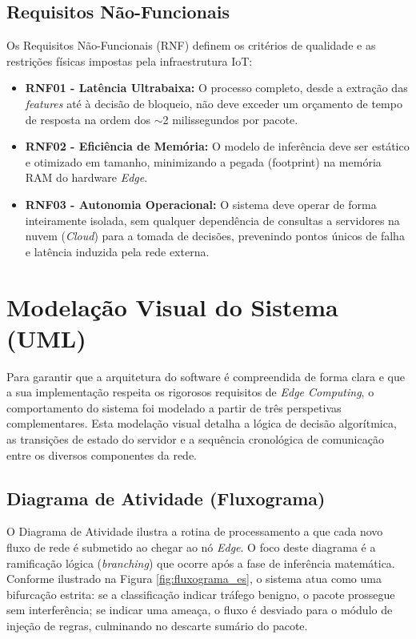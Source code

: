 \subsection{Requisitos Não-Funcionais}
Os Requisitos Não-Funcionais (RNF) definem os critérios de qualidade e as restrições físicas impostas pela infraestrutura \ac{IoT}:
\begin{itemize}
    \item \textbf{RNF01 - Latência Ultrabaixa:} O processo completo, desde a extração das \textit{features} até à decisão de bloqueio, não deve exceder um orçamento de tempo de resposta na ordem dos $\sim$2 milissegundos por pacote.
    \item \textbf{RNF02 - Eficiência de Memória:} O modelo de inferência deve ser estático e otimizado em tamanho, minimizando a pegada (footprint) na memória RAM do hardware \textit{Edge}.
    \item \textbf{RNF03 - Autonomia Operacional:} O sistema deve operar de forma inteiramente isolada, sem qualquer dependência de consultas a servidores na nuvem (\textit{Cloud}) para a tomada de decisões, prevenindo pontos únicos de falha e latência induzida pela rede externa.
\end{itemize}

\section{Modelação Visual do Sistema (UML)}
\label{sec:es_modelacao}

Para garantir que a arquitetura do software é compreendida de forma clara e que a sua implementação respeita os rigorosos requisitos de \textit{Edge Computing}, o comportamento do sistema foi modelado a partir de três perspetivas complementares. Esta modelação visual detalha a lógica de decisão algorítmica, as transições de estado do servidor e a sequência cronológica de comunicação entre os diversos componentes da rede.

\subsection{Diagrama de Atividade (Fluxograma)}
\label{sec:es_fluxograma}

O Diagrama de Atividade ilustra a rotina de processamento a que cada novo fluxo de rede é submetido ao chegar ao nó \textit{Edge}. O foco deste diagrama é a ramificação lógica (\textit{branching}) que ocorre após a fase de inferência matemática. Conforme ilustrado na Figura \ref{fig:fluxograma_es}, o sistema atua como uma bifurcação estrita: se a classificação indicar tráfego benigno, o pacote prossegue sem interferência; se indicar uma ameaça, o fluxo é desviado para o módulo de injeção de regras, culminando no descarte sumário do pacote.

